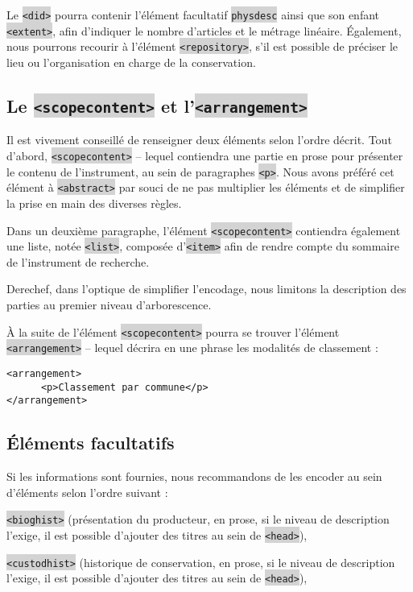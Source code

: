 \documentclass[hidelinks, 13pt]{report}
\newcommand{\code}[1]{\colorbox{LightGray}{\texttt{#1}}}
\begin{document}
	Le \code{<did>} pourra contenir l'élément facultatif \code{physdesc} ainsi que son enfant \code{<extent>}, afin d'indiquer le nombre d'articles et le métrage linéaire. Également, nous pourrons recourir à l'élément \code{<repository>}, s'il est possible de préciser le lieu ou l'organisation en charge de la conservation.
	
	\subsection{Le \code{<scopecontent>} et l'\code{<arrangement>}}
	
	Il est vivement conseillé de renseigner deux éléments selon l'ordre décrit. Tout d'abord, \code{<scopecontent>} -- lequel contiendra une partie en prose pour présenter le contenu de l'instrument, au sein de paragraphes \code{<p>}. Nous avons préféré cet élément à \code{<abstract>} par souci de ne pas multiplier les éléments et de simplifier la prise en main des diverses règles.
	
	Dans un deuxième paragraphe, l'élément \code{<scopecontent>} contiendra également une liste, notée \code{<list>}, composée d'\code{<item>} afin de rendre compte du sommaire de l'instrument de recherche. 
	
	Derechef, dans l'optique de simplifier l'encodage, nous limitons la description des parties au premier niveau d'arborescence.
	
	À la suite de l'élément \code{<scopecontent>} pourra se trouver l'élément \code{<arrangement>} -- lequel décrira en une phrase les modalités de classement :
	
\begin{lstlisting}[language=EAD]
<arrangement>
      <p>Classement par commune</p>
</arrangement>
\end{lstlisting}

	\subsection{Éléments facultatifs}
	
	Si les informations sont fournies, nous recommandons de les encoder au sein d'éléments selon l'ordre suivant :
	
	\code{<bioghist>} (présentation du producteur, en prose, si le niveau de description l'exige, il est possible d'ajouter des titres au sein de \code{<head>}),
	
	\code{<custodhist>} (historique de conservation, en prose, si le niveau de description l'exige, il est possible d'ajouter des titres au sein de \code{<head>}),
	
\end{document}
